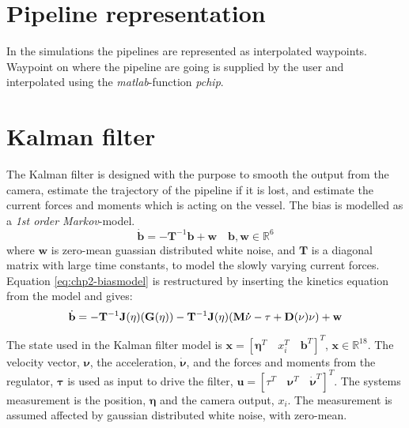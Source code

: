 	


\section{Pipeline representation}
	In the simulations the pipelines are represented as interpolated waypoints. Waypoint on where the pipeline are going is supplied by the user and interpolated using the \textit{matlab}-function \textit{pchip}. 


\section{Kalman filter}
	The Kalman filter is designed with the purpose to smooth the output from the camera, estimate the trajectory of the pipeline if it is lost, and estimate the current forces and moments which is acting on the vessel. The bias is modelled as a \textit{1st order Markov}-model.
	\begin{equation}
		\label{eq:chp2-biasmodel}
		\dot{\mathbf{b}} = -\mathbf{T}^{-1} \mathbf{b} + \mathbf{w} \quad \mathbf{b}, \mathbf{w} \in \mathbb{R}^6
	\end{equation}
	where $\mathbf{w}$ is zero-mean guassian distributed white noise, and $\mathbf{T}$ is a diagonal matrix with large time constants, to model the slowly varying current forces. 
	Equation \eqref{eq:chp2-biasmodel} is restructured by inserting the kinetics equation from the model and gives:
	\begin{equation}
		\dot{\mathbf{b}} = -\mathbf{T}^{-1} \mathbf{J}(\mathbf{\eta}) (\mathbf{G}(\mathbf{\eta})) - \mathbf{T}^{-1} \mathbf{J}(\mathbf{\eta}) (\mathbf{M}\mathbf{\dot{\nu}} - \tau + \mathbf{D}(\mathbf{\nu})\mathbf{\nu}) + \mathbf{w}
	\end{equation}

	
	The state used in the Kalman filter model is $\mathbf{x} = [\mathbf{\eta}^T \quad x_i^T \quad \mathbf{b}^T]^T$, $\mathbf{x} \in \mathbb{R}^{18}$. The velocity vector, $\mathbf{\nu}$, the acceleration, $\dot{\mathbf{\nu}}$, and the forces and moments from the regulator, $\mathbf{\tau}$ is used as input to drive the filter, $\mathbf{u} = [\tau^T \quad \mathbf{\nu}^T \quad \mathbf{\dot{\nu}}^T]^T$. The systems measurement is the position, $\mathbf{\eta}$ and the camera output, $x_i$. The measurement is assumed affected by gaussian distributed white noise, with zero-mean.
	

